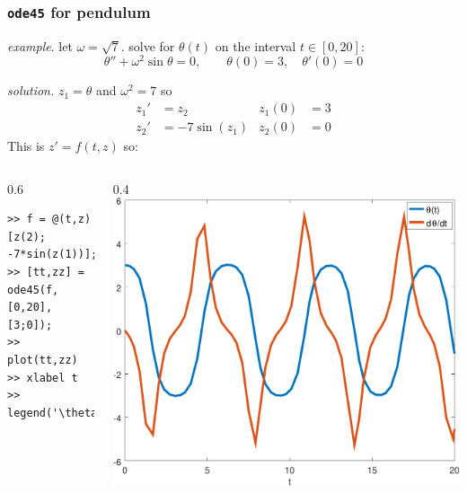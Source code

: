 \documentclass[urlcolor=blue,dvipsnames]{beamer}
\begin{document}
\begin{frame}[fragile]
\frametitle{\texttt{ode45} for pendulum}

\noindent \emph{example}.  let $\omega=\sqrt{7}$.  solve for $\theta(t)$ on the interval $t\in [0,20]$:
    $$\theta''+ \omega^2 \sin\theta = 0, \qquad \theta(0)=3, \quad \theta'(0)=0$$

\noindent \emph{solution.}  $z_1=\theta$ and $\omega^2=7$ so
\begin{align*}
z_1' &= z_2 & z_1(0)&=3 \\
z_2' &= - 7 \sin(z_1) & z_2(0)&=0
\end{align*}
This is $z'=f(t,z)$ so:

\begin{columns}
\begin{column}{0.6\textwidth}
\begin{Verbatim}[fontsize=\small]
>> f = @(t,z) [z(2); -7*sin(z(1))];
>> [tt,zz] = ode45(f,[0,20],[3;0]);
>> plot(tt,zz)
>> xlabel t
>> legend('\theta(t)','d\theta/dt')
\end{Verbatim}

\vspace{10mm}
\end{column}
\begin{column}{0.4\textwidth}
\includegraphics[width=\textwidth]{figs/pend-chunky}
\end{column}
\end{columns}
\end{frame}
\end{document}
